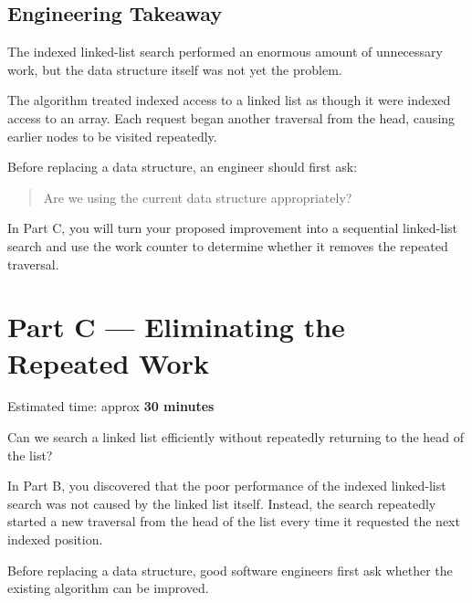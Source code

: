 \documentclass{csc2059practical}
\begin{document}
\subsection{Engineering Takeaway}

The indexed linked-list search performed an enormous amount of unnecessary work,
but the data structure itself was not yet the problem.

The algorithm treated indexed access to a linked list as though it were indexed
access to an array. Each request began another traversal from the head, causing
earlier nodes to be visited repeatedly.

Before replacing a data structure, an engineer should first ask:

\begin{quote}
Are we using the current data structure appropriately?
\end{quote}

In Part C, you will turn your proposed improvement into a sequential
linked-list search and use the work counter to determine whether it removes the
repeated traversal.


\section{Part C --- Eliminating the Repeated Work}


\begin{infobox}
Estimated time: approx \textbf{30 minutes}
\end{infobox}


\begin{engineeringquestion}
Can we search a linked list efficiently without repeatedly returning to the
head of the list?
\end{engineeringquestion}

In Part B, you discovered that the poor performance of the indexed linked-list
search was not caused by the linked list itself. Instead, the search repeatedly
started a new traversal from the head of the list every time it requested the
next indexed position.

Before replacing a data structure, good software engineers first ask whether
the existing algorithm can be improved.
\end{document}
